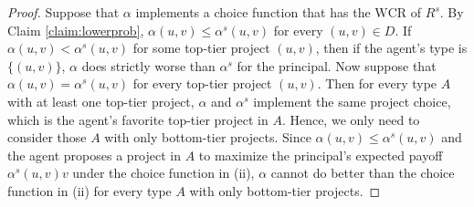 \documentclass[12pt,english]{article}
\theoremstyle{remark}
\theoremstyle{plain}
\theoremstyle{definition}
\newcommand{\wcr}{\mathrm{WCR}}
\begin{document}
\begin{proof} %

Suppose that $\alpha$ implements a choice function that has the $\wcr$ of $R^s$. By Claim \ref{claim:lowerprob}, $\alpha(u,v) \leqslant \alpha^s(u,v)$ for every $(u,v) \in D$. If $\alpha(u,v)<\alpha^s(u,v)$ for some top-tier project $(u,v)$, then if the agent's type is $\{(u,v)\}$, $\alpha$ does strictly worse than $\alpha^s$ for the principal. Now suppose that $\alpha(u,v)=\alpha^s(u,v)$ for every top-tier project $(u,v)$. Then for every type $A$ with at least one top-tier project, $\alpha$ and $\alpha^s$ implement the same project choice, which is the agent's favorite top-tier project in $A$. Hence, we only need to consider those $A$ with only bottom-tier projects. Since $\alpha(u,v) \leqslant \alpha^s(u,v)$ and the agent proposes a project in $A$ to maximize the principal's expected payoff $\alpha^s(u,v)v$ under the choice function in (ii), $\alpha$ cannot do better than the choice function in (ii) for every type $A$ with only bottom-tier projects.

%
%
%



\end{proof}
\end{document}
